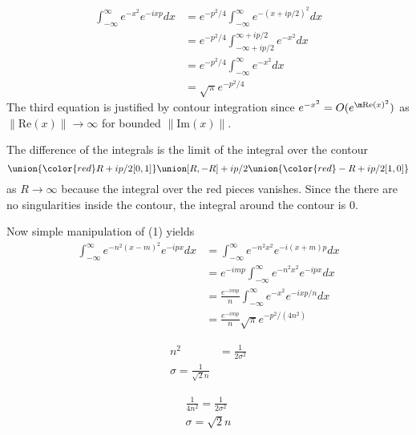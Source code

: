\begin{align*}
\int_{-\infty }^{\infty }e^{-x^{2}}e^{-ixp}dx &= e^{-p^{2}/4}\int_{-\infty }^{\infty }e^{-(x+ip/2)^{2}}dx\nonumber \\
&=e^{-p^{2}/4}\int_{-\infty +ip/2 }^{\infty+ip/2 }e^{-x^{2}}dx\nonumber \\
&=e^{-p^{2}/4}\int_{-\infty }^{\infty }e^{-x^{2}}dx\nonumber \\
&=\sqrt{\pi }e^{-p^{2}/4}
\end{align*}
The third equation is justified by contour integration since
$e^{-x^{2}}=O(e^{\m\mathrm{Re}(x)^2})$ as
$\|\mathrm{Re}(x)\|\rightarrow \infty $ for bounded $\|
\mathrm{Im}(x)\|$.

The difference of the integrals is the limit of the integral over the
contour
\begin{equation*}
[-R,R]\union {\color{red} R + ip/2[0,1]} \union [R,-R] + i p/2 \union
{\color{red} -R +ip/2[1,0]}
\end{equation*}
as $R\rightarrow\infty$ because the integral over the red pieces
vanishes. Since the there are no singularities inside the contour, the
integral around the contour is 0.

Now simple manipulation of (1) yields
\begin{align*}
\int_{-\infty }^{\infty }e^{-n^{2}(x-m)^{2}}e^{-ipx}dx &= \int_{-\infty }^{\infty }e^{-n^{2}x^{2}}e^{-i(x+m)p}dx\nonumber \\
&=e^{-imp}\int_{-\infty }^{\infty }e^{-n^{2}x^{2}}e^{-ipx}dx\nonumber \\
&=\frac{e^{-imp}}{n}\int_{-\infty }^{\infty }e^{-x^{2}}e^{-ixp/n}dx\nonumber \\
&=\frac{e^{-imp}}{n}\sqrt{\pi }e^{-p^{2}/(4n^{2})}
\end{align*}

\begin{align}
n^{2} &= \frac{1}{2\sigma^{2}}\nonumber \\
\sigma = \frac{1}{\sqrt{2}n}
\end{align}

\begin{align*}
\frac{1}{4n^{2}} = \frac{1}{2\sigma^{2}}\nonumber \\
\sigma = \sqrt{2}n
\end{align*}
